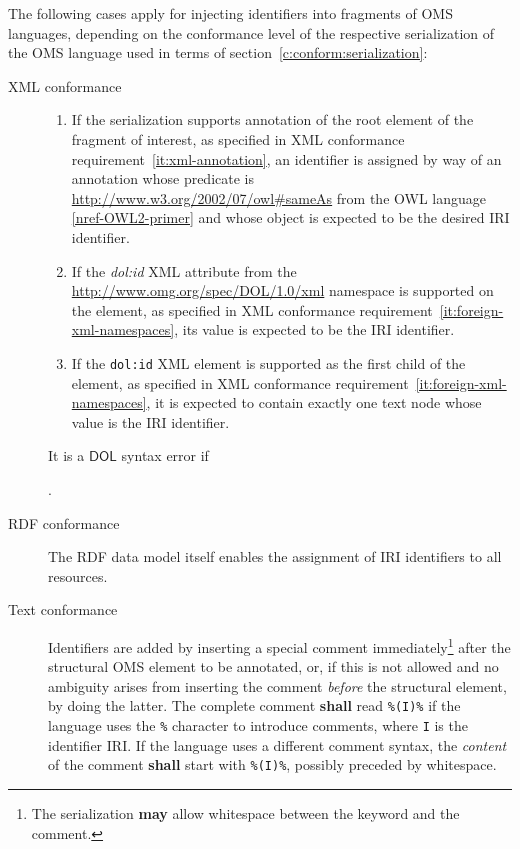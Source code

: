 \documentclass[10pt, a4paper]{isov2}
\newcommand*{\shall}{\textbf{shall}\xspace}
\newcommand*{\may}{\textbf{may}\xspace}
\newcommand*{\DOL}{\ensuremath{\mathsf{DOL}}\xspace}
\renewcommand{\noterefname}{note}
\renewcommand{\nref}[1]{\noterefname~\ref{#1}}
\renewcommand{\nref}[1]{\ref{nref-#1}}
\begin{document}
The following cases apply for injecting identifiers into fragments of OMS languages, depending on the conformance level of the respective serialization of the OMS language used in terms of section~\ref{c:conform:serialization}:
\begin{description}
\item[XML conformance]
  \begin{enumerate}
  \item If the serialization supports annotation of the root element of the fragment of interest, as specified in XML conformance requirement~\ref{it:xml-annotation}, an identifier is assigned by way of an annotation whose predicate is \url{http://www.w3.org/2002/07/owl#sameAs} from the OWL language \nref{OWL2-primer} and whose object is expected to be the desired IRI identifier.
  \item If the \textit{dol:id} XML attribute from the \url{http://www.omg.org/spec/DOL/1.0/xml} namespace is supported on the element, as specified in XML conformance requirement~\ref{it:foreign-xml-namespaces}, its value is expected to be the IRI identifier.
  \item If the \texttt{dol:id} XML element is supported as the first child of the element, as specified in XML conformance requirement~\ref{it:foreign-xml-namespaces}, it is expected to contain exactly one text node whose value is the IRI identifier.
  \end{enumerate}
  It is a \DOL syntax error if .
\item[RDF conformance] The RDF data model itself enables the assignment of IRI identifiers to all resources.
\item[Text conformance] Identifiers are added by inserting a special comment immediately\footnote{The serialization \may allow whitespace between the keyword and the comment.} after the structural OMS element to be annotated, or, if this is not allowed and no ambiguity arises from inserting the comment \emph{before} the structural element, by doing the latter.  The complete comment \shall read \texttt{\%(I)\%} if the language uses the \texttt{\%} character to introduce comments, where \texttt{I} is the identifier IRI.  If the language uses a different comment syntax, the \emph{content} of the comment \shall start with \texttt{\%(I)\%}, possibly preceded by whitespace.

\end{description}
\end{document}
